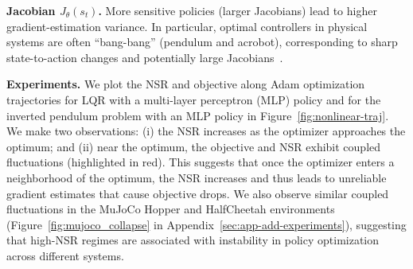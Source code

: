 \textbf{Jacobian $J_\theta(s_t)$.} More sensitive policies (larger Jacobians) lead to higher gradient-estimation variance. In particular, optimal controllers in physical systems are often ``bang-bang'' (\eg pendulum and acrobot), corresponding to sharp state-to-action changes and potentially large Jacobians~\cite{aastrom00pendulum-bangbang, han24l4dc-pendulum}.


\textbf{Experiments.} We plot the NSR and objective along Adam optimization trajectories for LQR with a multi-layer perceptron (MLP) policy and for the inverted pendulum problem with an MLP policy in Figure~\ref{fig:nonlinear-traj}. We make two observations: (i) the NSR increases as the optimizer approaches the optimum; and (ii) near the optimum, the objective and NSR exhibit coupled fluctuations (highlighted in red). This suggests that once the optimizer enters a neighborhood of the optimum, the NSR increases and thus leads to unreliable gradient estimates that cause objective drops. We also observe similar coupled fluctuations in the MuJoCo Hopper and HalfCheetah environments (Figure~\ref{fig:mujoco_collapse} in Appendix~\ref{sec:app-add-experiments}), suggesting that high-NSR regimes are associated with instability in policy optimization across different systems.
